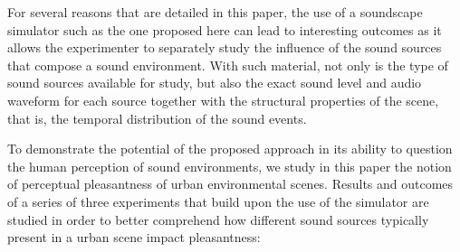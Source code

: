 \documentclass[12pt]{elsarticle}
\newcommand{\ie}{\emph{i.\,e.}}
\begin{document}

For several reasons that are detailed in this paper, the use of a soundscape simulator such as the one proposed here can lead to interesting outcomes as it allows the experimenter to separately study  the influence of the sound sources that compose a sound environment. With such material, not only is the type of sound sources available for study, but also the exact sound level and audio waveform for each source together with the structural properties of the scene, that is, the temporal distribution of the sound events.


To demonstrate the potential of the proposed approach in its ability to question the human perception of sound environments, we study in this paper the notion of perceptual pleasantness of urban environmental scenes. Results and outcomes of a series of three experiments that build upon the use of the simulator are studied in order to better comprehend how different sound sources typically present in a urban scene impact pleasantness:

\end{document}
